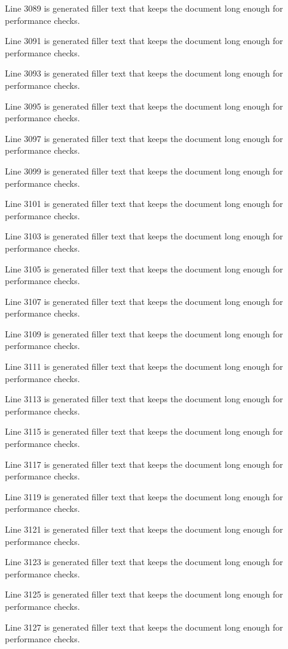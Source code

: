 Line 3089 is generated filler text that keeps the document long enough for performance checks.

Line 3091 is generated filler text that keeps the document long enough for performance checks.

Line 3093 is generated filler text that keeps the document long enough for performance checks.

Line 3095 is generated filler text that keeps the document long enough for performance checks.

Line 3097 is generated filler text that keeps the document long enough for performance checks.

Line 3099 is generated filler text that keeps the document long enough for performance checks.

Line 3101 is generated filler text that keeps the document long enough for performance checks.

Line 3103 is generated filler text that keeps the document long enough for performance checks.

Line 3105 is generated filler text that keeps the document long enough for performance checks.

Line 3107 is generated filler text that keeps the document long enough for performance checks.

Line 3109 is generated filler text that keeps the document long enough for performance checks.

Line 3111 is generated filler text that keeps the document long enough for performance checks.

Line 3113 is generated filler text that keeps the document long enough for performance checks.

Line 3115 is generated filler text that keeps the document long enough for performance checks.

Line 3117 is generated filler text that keeps the document long enough for performance checks.

Line 3119 is generated filler text that keeps the document long enough for performance checks.

Line 3121 is generated filler text that keeps the document long enough for performance checks.

Line 3123 is generated filler text that keeps the document long enough for performance checks.

Line 3125 is generated filler text that keeps the document long enough for performance checks.

Line 3127 is generated filler text that keeps the document long enough for performance checks.


